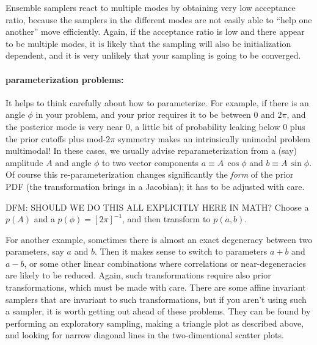 \documentclass[12pt,twoside,pdftex]{article}
\begin{document}
Ensemble samplers react to multiple modes
  by obtaining very low acceptance ratio,
  because the samplers in the different modes are not easily able to ``help one another''
  move efficiently.
Again, if the acceptance ratio is low and there appear to be multiple modes,
  it is likely that the sampling will also be initialization dependent,
  and it is very unlikely that your sampling is going to be converged.

\paragraph{parameterization problems:}
It helps to think carefully about how to parameterize.
For example, if there is an angle $\phi$ in your problem,
  and your prior requires it to be between $0$ and $2\pi$,
  and the posterior mode is very near $0$,
  a little bit of probability leaking below $0$ plus the prior cutoffs plus mod-$2\pi$ symmetry
  makes an intrinsically unimodal problem multimodal!
In these cases, we usually advise reparameterization from a (say) amplitude $A$ and angle $\phi$
  to two vector components $a\equiv A\,\cos\phi$ and $b\equiv A\,\sin\phi$.
Of course this re-parameterization changes significantly the \emph{form} of the prior PDF
  (the transformation brings in a Jacobian);
  it has to be adjusted with care.

DFM: SHOULD WE DO THIS ALL EXPLICITLY HERE IN MATH?
Choose a $p(A)$ and a $p(\phi) = [2\pi]^{-1}$,
   and then transform to $p(a, b)$.


For another example, sometimes there is almost an exact degeneracy between two parameters,
  say $a$ and $b$.  Then it makes sense to switch to parameters $a+b$ and $a-b$,
  or some other linear combinations where correlations or near-degeneracies are likely to be reduced.
Again, such transformations require also prior transformations, which must be made with care.
There are some affine invariant samplers that are invariant to such transformations,
  but if you aren't using such a sampler,
  it is worth getting out ahead of these problems.
They can be found by performing an exploratory sampling,
  making a triangle plot as described above,
  and looking for narrow diagonal lines in the two-dimentional scatter plots.
\end{document}
